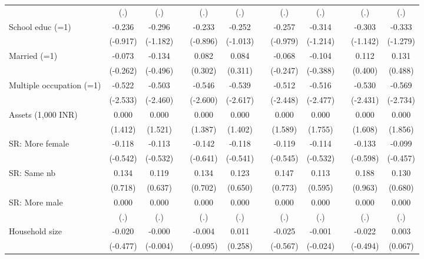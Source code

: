 {\begin{longtable}{@{\extracolsep{\fill}}lccccccccccc}
          & (.)   & (.)   &       & (.)   & (.)   &       & (.)   & (.)   &       & (.)   & (.) \\
    School educ (=1) & -0.236 & -0.296 &       & -0.233 & -0.252 &       & -0.257 & -0.314 &       & -0.303 & -0.333 \\
          & (-0.917) & (-1.182) &       & (-0.896) & (-1.013) &       & (-0.979) & (-1.214) &       & (-1.142) & (-1.279) \\
    Married (=1) & -0.073 & -0.134 &       & 0.082 & 0.084 &       & -0.068 & -0.104 &       & 0.112 & 0.131 \\
          & (-0.262) & (-0.496) &       & (0.302) & (0.311) &       & (-0.247) & (-0.388) &       & (0.400) & (0.488) \\
    Multiple occupation (=1) & -0.522 & -0.503 &       & -0.546 & -0.539 &       & -0.512 & -0.516 &       & -0.530 & -0.569 \\
          & (-2.533) & (-2.460) &       & (-2.600) & (-2.617) &       & (-2.448) & (-2.477) &       & (-2.431) & (-2.734) \\
    Assets (1,000 INR) & 0.000 & 0.000 &       & 0.000 & 0.000 &       & 0.000 & 0.000 &       & 0.000 & 0.000 \\
          & (1.412) & (1.521) &       & (1.387) & (1.402) &       & (1.589) & (1.755) &       & (1.608) & (1.856) \\
    SR: More female & -0.118 & -0.113 &       & -0.142 & -0.118 &       & -0.119 & -0.114 &       & -0.133 & -0.099 \\
          & (-0.542) & (-0.532) &       & (-0.641) & (-0.541) &       & (-0.545) & (-0.532) &       & (-0.598) & (-0.457) \\
    SR: Same nb & 0.134 & 0.119 &       & 0.134 & 0.123 &       & 0.147 & 0.113 &       & 0.188 & 0.130 \\
          & (0.718) & (0.637) &       & (0.702) & (0.650) &       & (0.773) & (0.595) &       & (0.963) & (0.680) \\
    SR: More male & 0.000 & 0.000 &       & 0.000 & 0.000 &       & 0.000 & 0.000 &       & 0.000 & 0.000 \\
          & (.)   & (.)   &       & (.)   & (.)   &       & (.)   & (.)   &       & (.)   & (.) \\
    Household size & -0.020 & -0.000 &       & -0.004 & 0.011 &       & -0.025 & -0.001 &       & -0.022 & 0.003 \\
          & (-0.477) & (-0.004) &       & (-0.095) & (0.258) &       & (-0.567) & (-0.024) &       & (-0.494) & (0.067) \\

\end{longtable}}
